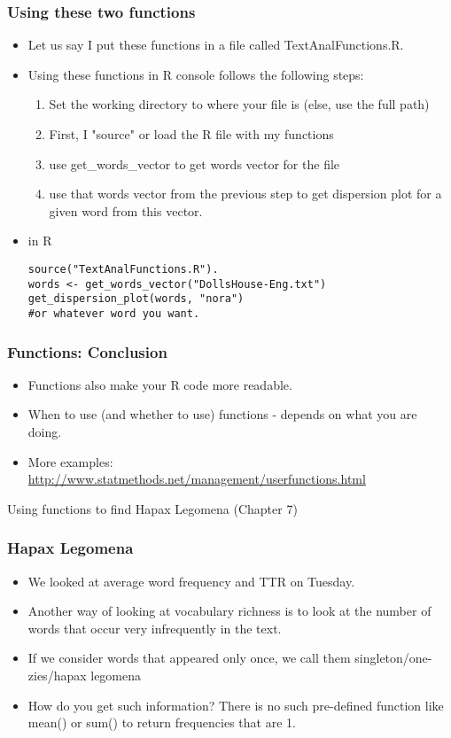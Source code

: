 \documentclass{beamer}
\begin{document}
\begin{frame}[fragile]
\frametitle{Using these two functions}
\begin{itemize}
\item Let us say I put these functions in a file called TextAnalFunctions.R.
\item Using these functions in R console follows the following steps:
\begin{enumerate}
\item Set the working directory to where your file is (else, use the full path)
\item First, I "source" or load the R file with my functions
\item use get\_words\_vector to get words vector for the file
\item use that words vector from the previous step to get dispersion plot for a given word from this vector.
\end{enumerate}
\item in R \begin{verbatim}
source("TextAnalFunctions.R").
words <- get_words_vector("DollsHouse-Eng.txt")
get_dispersion_plot(words, "nora") 
#or whatever word you want. 
\end{verbatim}
\end{itemize}
\end{frame}

\begin{frame}
\frametitle{Functions: Conclusion}
\begin{itemize}
\item Functions also make your R code more readable.
\item When to use (and whether to use) functions - depends on what you are doing.
\item More examples: \url{http://www.statmethods.net/management/userfunctions.html}
\end{itemize}
\end{frame}

\begin{frame}
\Large Using functions to find Hapax Legomena (Chapter 7)
\end{frame}

\begin{frame}
\frametitle{Hapax Legomena}
\begin{itemize}
\item We looked at average word frequency and TTR on Tuesday. 
\item Another way of looking at vocabulary richness is to look at the number of words that occur very infrequently in the text. 
\item If we consider words that appeared only once, we call them singleton/one-zies/hapax legomena
\item How do you get such information? There is no such pre-defined function like mean() or sum() to return frequencies that are 1. 
\end{itemize}
\end{frame}
\end{document}
